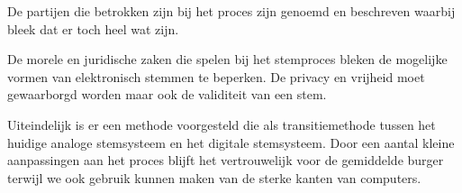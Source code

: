 \documentclass[a4paper]{article}
\newcommand{\TODO}[1]{{\color{red}\textbf{TODO: #1}}}
\renewcommand{\TODO}[1]{}
\begin{document}
De partijen die betrokken zijn bij het proces zijn genoemd en beschreven waarbij bleek dat er toch heel wat zijn. 

De morele en juridische zaken die spelen bij het stemproces bleken de mogelijke vormen van elektronisch stemmen te beperken. De privacy en vrijheid moet gewaarborgd worden maar ook de validiteit van een stem. 

Uiteindelijk is er een methode voorgesteld die als transitiemethode tussen het huidige analoge stemsysteem en het digitale stemsysteem. Door een aantal kleine aanpassingen aan het proces blijft het vertrouwelijk voor de gemiddelde burger terwijl we ook gebruik kunnen maken van de sterke kanten van computers. 
\TODO{checky check}


\renewcommand\refname{Literatuur}

\end{document}
